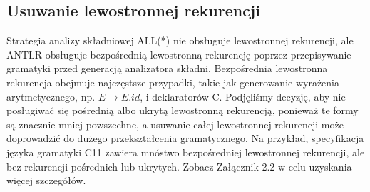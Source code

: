 ﻿\subsection{Usuwanie lewostronnej rekurencji}
Strategia analizy składniowej ALL(*) nie obsługuje lewostronnej rekurencji,
ale ANTLR obsługuje bezpośrednią lewostronną rekurencję poprzez przepisywanie
gramatyki przed generacją analizatora składni.
Bezpośrednia lewostronna rekurencja obejmuje najczęstsze przypadki,
takie jak generowanie wyrażenia arytmetycznego,
np. $E \rightarrow E.id$, i deklaratorów C.
Podjęliśmy decyzję, aby nie posługiwać się pośrednią albo ukrytą lewostronną
rekurencją, ponieważ te formy są znacznie mniej powszechne,
a usuwanie całej lewostronnej rekurencji może doprowadzić do dużego
przekształcenia gramatycznego.
Na przykład, specyfikacja języka gramatyki C11 zawiera mnóstwo bezpośredniej
lewostronnej rekurencji, ale bez rekurencji pośrednich lub ukrytych.
Zobacz Załącznik 2.2 w celu uzyskania więcej szczegółów.
